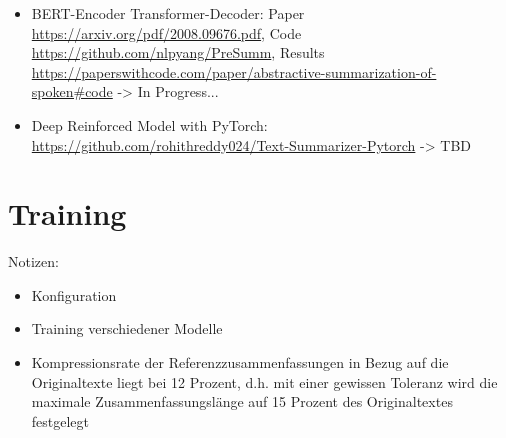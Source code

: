 \begin{itemize}
	\item BERT-Encoder Transformer-Decoder: Paper \url{https://arxiv.org/pdf/2008.09676.pdf}, Code \url{https://github.com/nlpyang/PreSumm}, Results \url{https://paperswithcode.com/paper/abstractive-summarization-of-spoken#code} -> In Progress...
	\item Deep Reinforced Model with PyTorch: \url{https://github.com/rohithreddy024/Text-Summarizer-Pytorch} -> TBD
\end{itemize}


\section{Training}
Notizen:
\begin{itemize}
	\item Konfiguration
	\item Training verschiedener Modelle
	\item Kompressionsrate der Referenzzusammenfassungen in Bezug auf die Originaltexte liegt bei 12 Prozent, d.h. mit einer gewissen Toleranz wird die maximale Zusammenfassungslänge auf 15 Prozent des Originaltextes festgelegt
\end{itemize}


